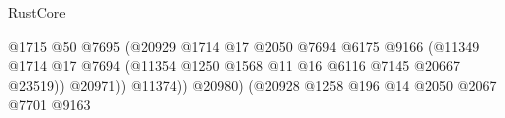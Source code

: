 \begin{lexlean}{RustCore}
\begin{coremodule}
                                                                      @1715
                                                                      @50
                                                                      @7695
                                                                      (@20929
                                                                        @1714
                                                                        @17
                                                                        @2050
                                                                        @7694
                                                                        @6175
                                                                        @9166
                                                                        (@11349
                                                                          @1714
                                                                          @17
                                                                          @7694
                                                                          (@11354
                                                                            @1250
                                                                            @1568
                                                                            @11
                                                                            @16
                                                                            @6116
                                                                            @7145
                                                                            @20667
                                                                            @23519))
                                                                        @20971))
                                                                    @11374))
                                                                @20980)
                                                              (@20928
                                                                @1258
                                                                @196
                                                                @14
                                                                @2050
                                                                @2067
                                                                @7701
                                                                @9163

\end{coremodule}
\end{lexlean}
